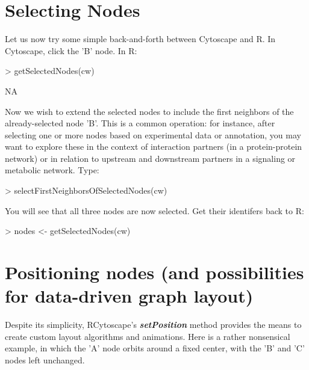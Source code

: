 \documentclass[12pt]{article}
\begin{document}
\section{Selecting Nodes}

Let us now try some simple back-and-forth between Cytoscape and R.  In Cytoscape, click the 'B' node.  In R:

\begin{Schunk}
\begin{Sinput}
> getSelectedNodes(cw)
\end{Sinput}
\begin{Soutput}
[1] NA
\end{Soutput}
\end{Schunk}

Now we wish to extend the selected nodes to include the first neighbors of the already-selected node 'B'.  This is a common operation: for instance, after selecting one or more nodes based on experimental data or annotation, you may want to explore these in the context of interaction partners (in a protein-protein network) or in relation to upstream and downstream partners in a signaling or metabolic network.  Type:

\begin{Schunk}
\begin{Sinput}
> selectFirstNeighborsOfSelectedNodes(cw)
\end{Sinput}
\end{Schunk}

You will see that all three nodes are now selected.  Get their identifers back to R:

\begin{Schunk}
\begin{Sinput}
> nodes <- getSelectedNodes(cw)
\end{Sinput}
\end{Schunk}


\section{Positioning nodes (and possibilities for data-driven graph layout)}

Despite its simplicity, RCytoscape's \emph{\textbf{setPosition}} method provides the means to create custom layout algorithms and animations.  Here is a rather nonsensical example, in which the 'A' node orbits around a fixed center, with the 'B' and 'C' nodes left unchanged.
\end{document}
